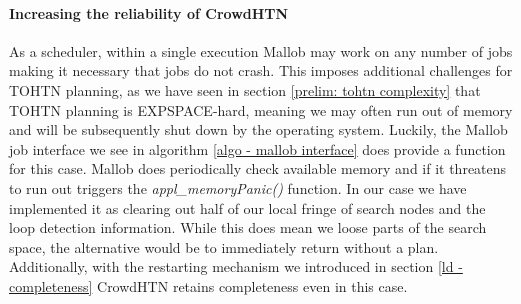 \paragraph{Increasing the reliability of CrowdHTN}
As a scheduler, within a single execution Mallob may work on any number of jobs making it necessary that jobs do not crash. This imposes additional challenges for TOHTN planning, as we have seen in section \ref{prelim: tohtn complexity} that TOHTN planning is EXPSPACE-hard, meaning we may often run out of memory and will be subsequently shut down by the operating system. Luckily, the Mallob job interface we see in algorithm \ref{algo - mallob interface} does provide a function for this case. Mallob does periodically check available memory and if it threatens to run out triggers the \textit{appl\_memoryPanic()} function. In our case we have implemented it as clearing out half of our local fringe of search nodes and the loop detection information. While this does mean we loose parts of the search space, the alternative would be to immediately return without a plan. Additionally, with the restarting mechanism we introduced in section \ref{ld - completeness} CrowdHTN retains completeness even in this case.

